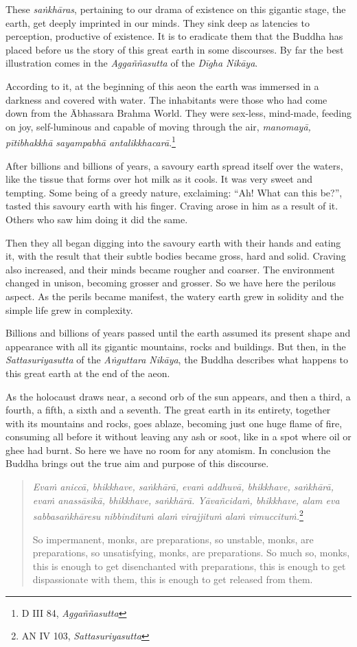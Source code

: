 These \emph{saṅkhāras}, pertaining to our drama of existence on this gigantic stage, the earth, get deeply imprinted in our minds. They sink deep as latencies to perception, productive of existence. It is to eradicate them that the Buddha has placed before us the story of this great earth in some discourses. By far the best illustration comes in the \emph{Aggaññasutta} of the \emph{Dīgha Nikāya}.

According to it, at the beginning of this aeon the earth was immersed in a darkness and covered with water. The inhabitants were those who had come down from the Ābhassara Brahma World. They were sex-less, mind-made, feeding on joy, self-luminous and capable of moving through the air, \emph{manomayā, pītibhakkhā sayampabhā antalikkhacarā}.\footnote{D III 84, \emph{Aggaññasutta}}

After billions and billions of years, a savoury earth spread itself over the waters, like the tissue that forms over hot milk as it cools. It was very sweet and tempting. Some being of a greedy nature, exclaiming: ``Ah! What can this be?'', tasted this savoury earth with his finger. Craving arose in him as a result of it. Others who saw him doing it did the same.

Then they all began digging into the savoury earth with their hands and eating it, with the result that their subtle bodies became gross, hard and solid. Craving also increased, and their minds became rougher and coarser. The environment changed in unison, becoming grosser and grosser. So we have here the perilous aspect. As the perils became manifest, the watery earth grew in solidity and the simple life grew in complexity.

Billions and billions of years passed until the earth assumed its present shape and appearance with all its gigantic mountains, rocks and buildings. But then, in the \emph{Sattasuriyasutta} of the \emph{Aṅguttara Nikāya}, the Buddha describes what happens to this great earth at the end of the aeon.

As the holocaust draws near, a second orb of the sun appears, and then a third, a fourth, a fifth, a sixth and a seventh. The great earth in its entirety, together with its mountains and rocks, goes ablaze, becoming just one huge flame of fire, consuming all before it without leaving any ash or soot, like in a spot where oil or ghee had burnt. So here we have no room for any atomism. In conclusion the Buddha brings out the true aim and purpose of this discourse.

\begin{quote}
\emph{Evaṁ aniccā, bhikkhave, saṅkhārā, evaṁ addhuvā, bhikkhave, saṅkhārā, evaṁ anassāsikā, bhikkhave, saṅkhārā. Yāvañcidaṁ, bhikkhave, alam eva sabbasaṅkhāresu nibbindituṁ alaṁ virajjituṁ alaṁ vimuccituṁ.}\footnote{AN IV 103, \emph{Sattasuriyasutta}}

So impermanent, monks, are preparations, so unstable, monks, are preparations, so unsatisfying, monks, are preparations. So much so, monks, this is enough to get disenchanted with preparations, this is enough to get dispassionate with them, this is enough to get released from them.
\end{quote}
